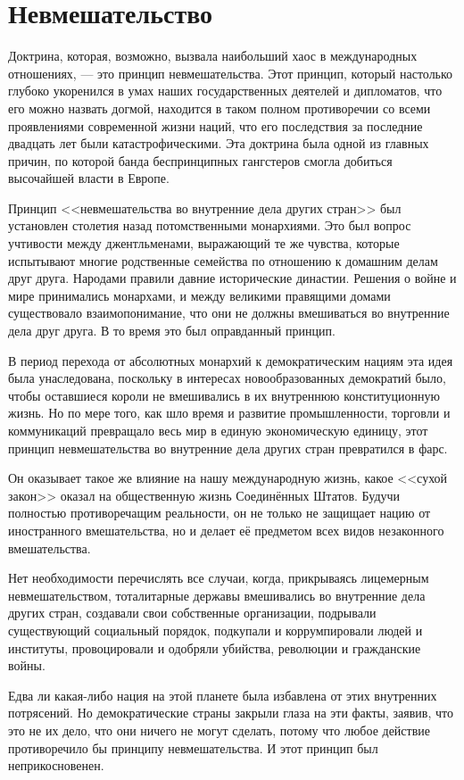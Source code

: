 \chapter{Невмешательство}

Доктрина, которая, возможно, вызвала наибольший хаос в международных отношениях, — это принцип невмешательства. Этот принцип, который настолько глубоко укоренился в умах наших государственных деятелей и дипломатов, что его можно назвать догмой, находится в таком полном противоречии со всеми проявлениями современной жизни наций, что его последствия за последние двадцать лет были катастрофическими. Эта доктрина была одной из главных причин, по которой банда беспринципных гангстеров смогла добиться высочайшей власти в Европе.
 
Принцип <<невмешательства во внутренние дела других стран>> был установлен столетия назад потомственными монархиями. Это был вопрос учтивости между джентльменами, выражающий те же чувства, которые испытывают многие родственные семейства по отношению к домашним делам друг друга. Народами правили давние исторические династии. Решения о войне и мире принимались монархами, и между великими правящими домами существовало взаимопонимание, что они не должны вмешиваться во внутренние дела друг друга. В то время это был оправданный принцип.

В период перехода от абсолютных монархий к демократическим нациям эта идея была унаследована, поскольку в интересах новообразованных демократий было, чтобы оставшиеся короли не вмешивались в их внутреннюю конституционную жизнь. Но по мере того, как шло время и развитие промышленности, торговли и коммуникаций превращало весь мир в единую экономическую единицу, этот принцип невмешательства во внутренние дела других стран превратился в фарс.
 
Он оказывает такое же влияние на нашу международную жизнь, какое <<сухой закон>> оказал на общественную жизнь Соединённых Штатов. Будучи полностью противоречащим реальности, он не только не защищает нацию от иностранного вмешательства, но и делает её предметом всех видов незаконного вмешательства.

Нет необходимости перечислять все случаи, когда, прикрываясь лицемерным невмешательством, тоталитарные державы вмешивались во внутренние дела других стран, создавали свои собственные организации, подрывали существующий социальный порядок, подкупали и коррумпировали людей и институты, провоцировали и одобряли убийства, революции и гражданские войны.
 
Едва ли какая-либо нация на этой планете была избавлена от этих внутренних потрясений. Но демократические страны закрыли глаза на эти факты, заявив, что это не их дело, что они ничего не могут сделать, потому что любое действие противоречило бы принципу невмешательства. И этот принцип был неприкосновенен.

